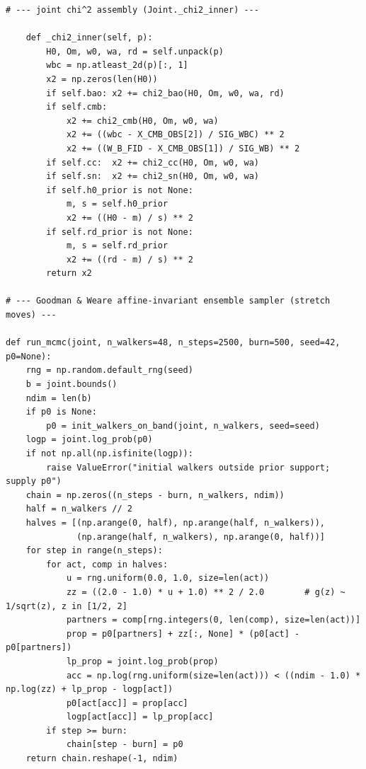 \documentclass[11pt,letterpaper]{article}
\begin{document}
\begin{lstlisting}
# --- joint chi^2 assembly (Joint._chi2_inner) ---

    def _chi2_inner(self, p):
        H0, Om, w0, wa, rd = self.unpack(p)
        wbc = np.atleast_2d(p)[:, 1]
        x2 = np.zeros(len(H0))
        if self.bao: x2 += chi2_bao(H0, Om, w0, wa, rd)
        if self.cmb:
            x2 += chi2_cmb(H0, Om, w0, wa)
            x2 += ((wbc - X_CMB_OBS[2]) / SIG_WBC) ** 2
            x2 += ((W_B_FID - X_CMB_OBS[1]) / SIG_WB) ** 2
        if self.cc:  x2 += chi2_cc(H0, Om, w0, wa)
        if self.sn:  x2 += chi2_sn(H0, Om, w0, wa)
        if self.h0_prior is not None:
            m, s = self.h0_prior
            x2 += ((H0 - m) / s) ** 2
        if self.rd_prior is not None:
            m, s = self.rd_prior
            x2 += ((rd - m) / s) ** 2
        return x2

# --- Goodman & Weare affine-invariant ensemble sampler (stretch moves) ---

def run_mcmc(joint, n_walkers=48, n_steps=2500, burn=500, seed=42, p0=None):
    rng = np.random.default_rng(seed)
    b = joint.bounds()
    ndim = len(b)
    if p0 is None:
        p0 = init_walkers_on_band(joint, n_walkers, seed=seed)
    logp = joint.log_prob(p0)
    if not np.all(np.isfinite(logp)):
        raise ValueError("initial walkers outside prior support; supply p0")
    chain = np.zeros((n_steps - burn, n_walkers, ndim))
    half = n_walkers // 2
    halves = [(np.arange(0, half), np.arange(half, n_walkers)),
              (np.arange(half, n_walkers), np.arange(0, half))]
    for step in range(n_steps):
        for act, comp in halves:
            u = rng.uniform(0.0, 1.0, size=len(act))
            zz = ((2.0 - 1.0) * u + 1.0) ** 2 / 2.0        # g(z) ~ 1/sqrt(z), z in [1/2, 2]
            partners = comp[rng.integers(0, len(comp), size=len(act))]
            prop = p0[partners] + zz[:, None] * (p0[act] - p0[partners])
            lp_prop = joint.log_prob(prop)
            acc = np.log(rng.uniform(size=len(act))) < ((ndim - 1.0) * np.log(zz) + lp_prop - logp[act])
            p0[act[acc]] = prop[acc]
            logp[act[acc]] = lp_prop[acc]
        if step >= burn:
            chain[step - burn] = p0
    return chain.reshape(-1, ndim)
\end{lstlisting}
\end{document}
